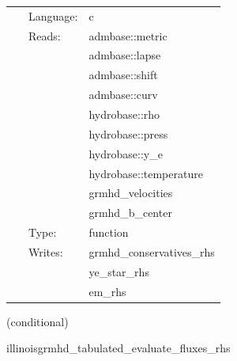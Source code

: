 \documentclass{article}
\begin{document}
 \begin{tabular*}{160mm}{cll} 
~ & Language:  & c \\ 
~ & Reads:  & admbase::metric \\ 
~& ~ &admbase::lapse\\ 
~& ~ &admbase::shift\\ 
~& ~ &admbase::curv\\ 
~& ~ &hydrobase::rho\\ 
~& ~ &hydrobase::press\\ 
~& ~ &hydrobase::y\_e\\ 
~& ~ &hydrobase::temperature\\ 
~& ~ &grmhd\_velocities\\ 
~& ~ &grmhd\_b\_center\\ 
~ & Type:  & function \\ 
~ & Writes:  & grmhd\_conservatives\_rhs \\ 
~& ~ &ye\_star\_rhs\\ 
~& ~ &em\_rhs\\ 
\end{tabular*} 


\vspace{5mm}

   (conditional) 

\hspace{5mm} illinoisgrmhd\_tabulated\_evaluate\_fluxes\_rhs 

\hspace{5mm}{\it tabulated version of illinoisgrmhd\_evaluate\_fluxes\_rhs } 


\hspace{5mm}
\end{document}
